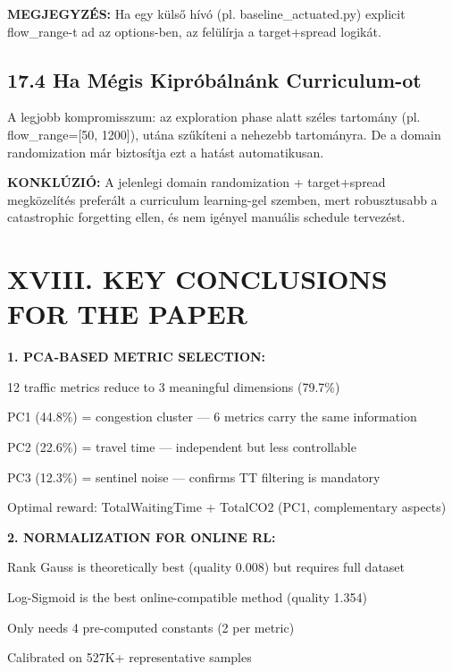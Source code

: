 \documentclass[11pt,a4paper]{article}
\begin{document}
\textbf{MEGJEGYZÉS:} Ha egy külső hívó (pl. baseline\_actuated.py) explicit
flow\_range-t ad az options-ben, az felülírja a target+spread logikát.

\subsection*{17.4 Ha Mégis Kipróbálnánk Curriculum-ot}
A legjobb kompromisszum: az exploration phase alatt széles tartomány
(pl. flow\_range=[50, 1200]), utána szűkíteni a nehezebb tartományra.
De a domain randomization már biztosítja ezt a hatást automatikusan.

\textbf{KONKLÚZIÓ:} A jelenlegi domain randomization + target+spread megközelítés
preferált a curriculum learning-gel szemben, mert robusztusabb a
catastrophic forgetting ellen, és nem igényel manuális schedule tervezést.


\section*{XVIII. KEY CONCLUSIONS FOR THE PAPER}

\textbf{1. PCA-BASED METRIC SELECTION:}
\par\noindent\hspace*{1em}\textbullet{} 12 traffic metrics reduce to 3 meaningful dimensions (79.7\%)
\par\noindent\hspace*{1em}\textbullet{} PC1 (44.8\%) = congestion cluster — 6 metrics carry the same information
\par\noindent\hspace*{1em}\textbullet{} PC2 (22.6\%) = travel time — independent but less controllable
\par\noindent\hspace*{1em}\textbullet{} PC3 (12.3\%) = sentinel noise — confirms TT filtering is mandatory
\par\noindent\hspace*{1em}\textbullet{} Optimal reward: TotalWaitingTime + TotalCO2 (PC1, complementary aspects)

\textbf{2. NORMALIZATION FOR ONLINE RL:}
\par\noindent\hspace*{1em}\textbullet{} Rank Gauss is theoretically best (quality 0.008) but requires full dataset
\par\noindent\hspace*{1em}\textbullet{} Log-Sigmoid is the best online-compatible method (quality 1.354)
\par\noindent\hspace*{1em}\textbullet{} Only needs 4 pre-computed constants (2 per metric)
\par\noindent\hspace*{1em}\textbullet{} Calibrated on 527K+ representative samples
\end{document}
